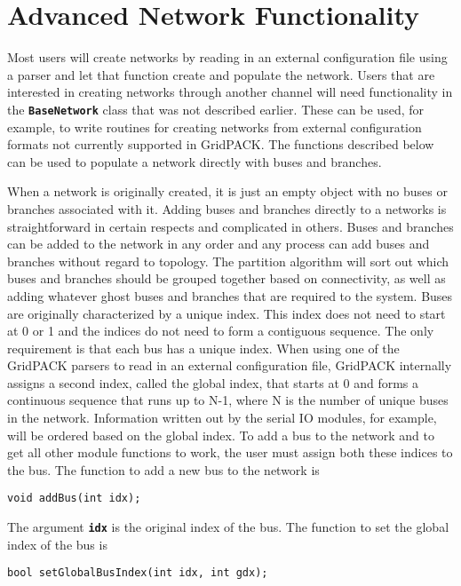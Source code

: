 \section{Advanced Network Functionality}

Most users will create networks by reading in an external configuration file using a parser and let that function create and populate the network. Users that are interested in creating networks through another channel will need functionality in the \texttt{\textbf{BaseNetwork}} class that was not described earlier. These can be used, for example, to write routines for creating networks from external configuration formats not currently supported in GridPACK. The functions described below can be used to populate a network directly with buses and branches.

When a network is originally created, it is just an empty object with no buses or branches associated with it. Adding buses and branches directly to a networks is straightforward in certain respects and complicated in others. Buses and branches can be added to the network in any order and any process can add buses and branches without regard to topology. The partition algorithm will sort out which buses and branches should be grouped together based on connectivity, as well as adding whatever ghost buses and branches that are required to the system. Buses are originally characterized by a unique index. This index does not need to start at 0 or 1 and the indices do not need to form a contiguous sequence. The only requirement is that each bus has a unique index. When using one of the GridPACK parsers to read in an external configuration file, GridPACK internally assigns a second index, called the global index, that starts at 0 and forms a continuous sequence that runs up to N-1, where N is the number of unique buses in the network. Information written out by the serial IO modules, for example, will be ordered based on the global index. To add a bus to the network and to get all other module functions to work, the user must assign both these indices to the bus. The function to add a new bus to the network is

{
\color{red}
\begin{Verbatim}[fontseries=b]
void addBus(int idx);
\end{Verbatim}
}

The argument \texttt{\textbf{idx}} is the original index of the bus. The function to set the global index of the bus is

{
\color{red}
\begin{Verbatim}[fontseries=b]
bool setGlobalBusIndex(int idx, int gdx);
\end{Verbatim}
}

